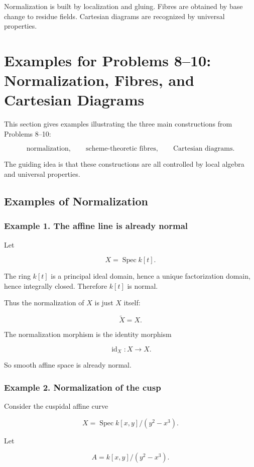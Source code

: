 \documentclass[12pt,a4paper]{article}
\theoremstyle{notespace}
\begin{document}
Normalization is built by localization and gluing.
Fibres are obtained by base change to residue fields.
Cartesian diagrams are recognized by universal properties.

\section{Examples for Problems 8--10: Normalization, Fibres, and Cartesian Diagrams}

This section gives examples illustrating the three main constructions from Problems 8--10:

\[
\text{normalization},\qquad
\text{scheme-theoretic fibres},\qquad
\text{Cartesian diagrams}.
\]

The guiding idea is that these constructions are all controlled by local algebra and universal properties.

\subsection{Examples of Normalization}

\subsubsection{Example 1. The affine line is already normal}

Let

\[
X=\operatorname{Spec}k[t].
\]

The ring \(k[t]\) is a principal ideal domain, hence a unique factorization domain, hence integrally closed. Therefore \(k[t]\) is normal.

Thus the normalization of \(X\) is just \(X\) itself:

\[
\widetilde{X}=X.
\]

The normalization morphism is the identity morphism

\[
\operatorname{id}_X:X\to X.
\]

So smooth affine space is already normal.

\subsubsection{Example 2. Normalization of the cusp}

Consider the cuspidal affine curve

\[
X=\operatorname{Spec}k[x,y]/(y^2-x^3).
\]

Let

\[
A=k[x,y]/(y^2-x^3).
\]
\end{document}
